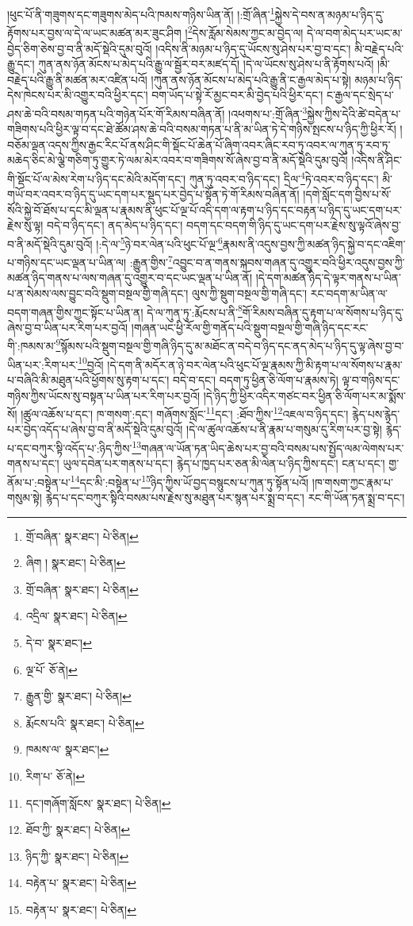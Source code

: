།ཕུང་པོ་ནི་གཟུགས་དང་གཟུགས་མེད་པའི་ཁམས་གཉིས་ཡིན་ནོ། །:གྲོ་ཞིན་\footnote{གྲོ་བཞིན་  སྣར་ཐང་།  པེ་ཅིན། }སྐྱེས་དེ་བས་ན་མཉམ་པ་ཉིད་དུ་རྟོགས་པར་བྱས་ལ་དེ་ལ་ཡང་མཚན་མར་ཟུང་ཤིག །\footnote{ཞིག །  སྣར་ཐང་།  པེ་ཅིན། }དེས་རློམ་སེམས་ཀྱང་མ་བྱེད་ལ། དེ་ལ་བག་མེད་པར་ཡང་མ་བྱེད་ཅིག་ཅེས་བྱ་བ་ནི་མདོ་སྡེའི་དུམ་བུའོ། །འདིས་ནི་མཉམ་པ་ཉིད་དུ་ཡོངས་སུ་ཤེས་པར་བྱ་བ་དང་། མི་བརྗེད་པའི་རྒྱུ་དང་། ཀུན་ནས་ཉོན་མོངས་པ་མེད་པའི་རྒྱུ་ལ་སྦྱོར་བར་མཛད་དོ། །དེ་ལ་ཡོངས་སུ་ཤེས་པ་ནི་རྟོགས་པའོ། །མི་བརྗེད་པའི་རྒྱུ་ནི་མཚན་མར་འཛིན་པའོ། །ཀུན་ནས་ཉོན་མོངས་པ་མེད་པའི་རྒྱུ་ནི་ང་རྒྱལ་མེད་པ་སྟེ། མཉམ་པ་ཉིད་དེས་ཁེངས་པར་མི་འགྱུར་བའི་ཕྱིར་དང་། བག་ཡོད་པ་སྟེ་རོ་མྱང་བར་མི་བྱེད་པའི་ཕྱིར་དང་། ང་རྒྱལ་དང་སྲེད་པ་ཤས་ཆེ་བའི་བསམ་གཏན་པའི་གཉེན་པོར་གོ་རིམས་བཞིན་ནོ། །འཕགས་པ་:གྲོ་ཞིན་\footnote{གྲོ་བཞིན་  སྣར་ཐང་།  པེ་ཅིན། }སྐྱེས་ཀྱིས་དེའི་ཚེ་བདེན་པ་གཟིགས་པའི་ཕྱིར་ལྟ་བ་དང་ཐེ་ཚོམ་ཤས་ཆེ་བའི་བསམ་གཏན་པ་ནི་མ་ཡིན་ཏེ་དེ་གཉིས་སྤངས་པ་ཉིད་ཀྱི་ཕྱིར་རོ། །བཅོམ་ལྡན་འདས་ཀྱིས་རྒྱང་རིང་པོ་ནས་ཤིང་གི་སྡོང་པོ་ཆེན་པོ་ཞིག་འབར་ཞིང་རབ་ཏུ་འབར་ལ་ཀུན་ཏུ་རབ་ཏུ་མཆེད་ཅིང་མེ་ལྕེ་གཅིག་ཏུ་གྱུར་ཏེ་ལམ་མེར་འབར་བ་གཟིགས་སོ་ཞེས་བྱ་བ་ནི་མདོ་སྡེའི་དུམ་བུའོ། །འདིས་ནི་ཤིང་གི་སྡོང་པོ་ལ་མེས་རེག་པ་ཉིད་དང་མེའི་མདོག་དང་། ཀུན་ཏུ་འབར་བ་ཉིད་དང་། དྲིལ་\footnote{འདྲིལ་  སྣར་ཐང་།  པེ་ཅིན། }ཏེ་འབར་བ་ཉིད་དང་། མི་གཡོ་བར་འབར་བ་ཉིད་དུ་ཡང་དག་པར་སྡུད་པར་བྱེད་པ་སྟོན་ཏེ་གོ་རིམས་བཞིན་ནོ། །དགེ་སློང་དག་བྱིས་པ་སོ་སོའི་སྐྱེ་བོ་ཐོས་པ་དང་མི་ལྡན་པ་རྣམས་ནི་ཕུང་པོ་ལྔ་པོ་འདི་དག་ལ་རྟག་པ་ཉིད་དང་བརྟན་པ་ཉིད་དུ་ཡང་དག་པར་རྗེས་སུ་ལྟ། བདེ་བ་ཉིད་དང་། ནད་མེད་པ་ཉིད་དང་། བདག་དང་བདག་གི་ཉིད་དུ་ཡང་དག་པར་རྗེས་སུ་ལྟའོ་ཞེས་བྱ་བ་ནི་མདོ་སྡེའི་དུམ་བུའོ། །:དེ་ལ་\footnote{དེ་བ་  སྣར་ཐང་། }ཉེ་བར་ལེན་པའི་ཕུང་པོ་ལྔ་\footnote{ལྔ་པོ་  ཅོ་ནེ། }རྣམས་ནི་འདུས་བྱས་ཀྱི་མཚན་ཉིད་སྐྱེ་བ་དང་འཇིག་པ་གཉིས་དང་ཡང་ལྡན་པ་ཡིན་ལ། :རྒྱུན་གྱིས་\footnote{རྒྱུན་གྱི་  སྣར་ཐང་།  པེ་ཅིན། }འབྱུང་བ་ན་གནས་སྐབས་གཞན་དུ་འགྱུར་བའི་ཕྱིར་འདུས་བྱས་ཀྱི་མཚན་ཉིད་གནས་པ་ལས་གཞན་དུ་འགྱུར་བ་དང་ཡང་ལྡན་པ་ཡིན་ནོ། །དེ་དག་མཚན་ཉིད་དེ་ལྟར་གནས་པ་ཡིན་པ་ན་སེམས་ལས་བྱུང་བའི་སྡུག་བསྔལ་གྱི་གཞི་དང་། ལུས་ཀྱི་སྡུག་བསྔལ་གྱི་གཞི་དང་། རང་བདག་མ་ཡིན་ལ་བདག་གཞན་གྱིས་ཀྱང་སྟོང་པ་ཡིན་ན། དེ་ལ་ཀུན་ཏུ་:རྨོངས་པ་ནི་\footnote{རྨོངས་པའི་  སྣར་ཐང་།  པེ་ཅིན། }གོ་རིམས་བཞིན་དུ་རྟག་པ་ལ་སོགས་པ་ཉིད་དུ་ཞེས་བྱ་བ་ཡིན་པར་རིག་པར་བྱའོ། །གཞན་ཡང་ཕྱི་རོལ་གྱི་གནོད་པའི་སྡུག་བསྔལ་གྱི་གཞི་ཉིད་དང་རང་གི་:ཁམས་མ་\footnote{ཁམས་ལ་  སྣར་ཐང་། }སྙོམས་པའི་སྡུག་བསྔལ་གྱི་གཞི་ཉིད་དུ་མ་མཐོང་ན་བདེ་བ་ཉིད་དང་ནད་མེད་པ་ཉིད་དུ་ལྟ་ཞེས་བྱ་བ་ཡིན་པར་:རིག་པར་\footnote{རིག་པ་  ཅོ་ནེ། }བྱའོ། །དེ་དག་ནི་མདོར་ན་ཉེ་བར་ལེན་པའི་ཕུང་པོ་ལྔ་རྣམས་ཀྱི་མི་རྟག་པ་ལ་སོགས་པ་རྣམ་པ་བཞིའི་མི་མཐུན་པའི་ཕྱོགས་སུ་རྟག་པ་དང་། བདེ་བ་དང་། བདག་ཏུ་ཕྱིན་ཅི་ལོག་པ་རྣམས་ཏེ། ལྟ་བ་གཉིས་དང་གཉིས་ཀྱིས་ཡོངས་སུ་བསྟན་པ་ཡིན་པར་རིག་པར་བྱའོ། །དེ་ཉིད་ཀྱི་ཕྱིར་འདིར་གཙང་བར་ཕྱིན་ཅི་ལོག་པར་མ་སྨོས་སོ། །ཚུལ་འཆོས་པ་དང་། ཁ་གསག་:དང་། གཞོགས་སློང་\footnote{དང་།གཞོག་སློངས་  སྣར་ཐང་།  པེ་ཅིན། }དང་། :ཐོབ་ཀྱིས་\footnote{ཐོབ་ཀྱི་  སྣར་ཐང་།  པེ་ཅིན། }འཇལ་བ་ཉིད་དང་། རྙེད་པས་རྙེད་པར་བྱེད་འདོད་པ་ཞེས་བྱ་བ་ནི་མདོ་སྡེའི་དུམ་བུའོ། །དེ་ལ་ཚུལ་འཆོས་པ་ནི་རྣམ་པ་གསུམ་དུ་རིག་པར་བྱ་སྟེ། རྙེད་པ་དང་བཀུར་སྟི་འདོད་པ་:ཉིད་ཀྱིས་\footnote{ཉིད་ཀྱི་  སྣར་ཐང་།  པེ་ཅིན། }གཞན་ལ་ཡོན་ཏན་ཡིད་ཆེས་པར་བྱ་བའི་བསམ་པས་སྤྱོད་ལམ་ལེགས་པར་གནས་པ་དང་། ཡུལ་དབེན་པར་གནས་པ་དང་། རྙེད་པ་ཁྱད་པར་ཅན་མི་ལེན་པ་ཉིད་ཀྱིས་དང་། ངན་པ་དང་། གྱ་ནོམ་པ་:བསྟེན་པ་\footnote{བརྟེན་པ་  སྣར་ཐང་།  པེ་ཅིན། }དང་མི་:བསྟེན་པ་\footnote{བརྟེན་པ་  སྣར་ཐང་།  པེ་ཅིན། }ཉིད་ཀྱིས་ཡོ་བྱད་བསྙུངས་པ་ཀུན་ཏུ་སྟོན་པའོ། །ཁ་གསག་ཀྱང་རྣམ་པ་གསུམ་སྟེ། རྙེད་པ་དང་བཀུར་སྟིའི་བསམ་པས་རྗེས་སུ་མཐུན་པར་སྙན་པར་སྨྲ་བ་དང་། རང་གི་ཡོན་ཏན་སྨྲ་བ་དང་། 